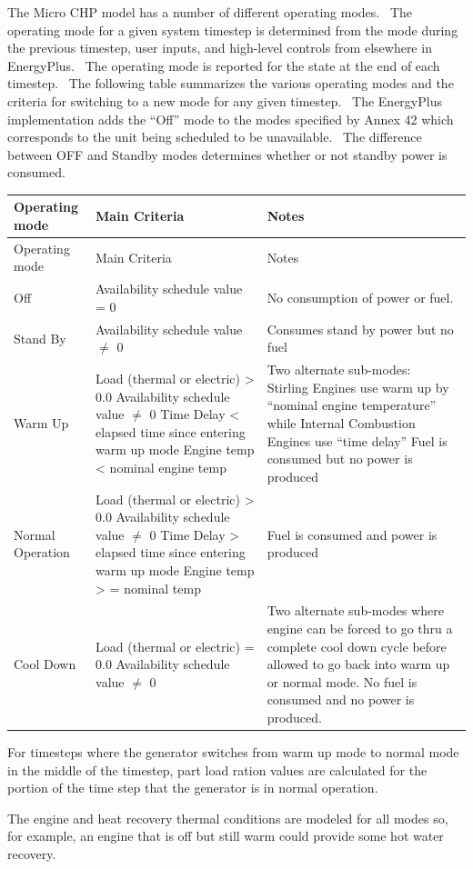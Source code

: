 The Micro CHP model has a number of different operating modes.~ The operating mode for a given system timestep is determined from the mode during the previous timestep, user inputs, and high-level controls from elsewhere in EnergyPlus.~ The operating mode is reported for the state at the end of each timestep.~ The following table summarizes the various operating modes and the criteria for switching to a new mode for any given timestep.~ The EnergyPlus implementation adds the ``Off'' mode to the modes specified by Annex 42 which corresponds to the unit being scheduled to be unavailable.~ The difference between OFF and Standby modes determines whether or not standby power is consumed.

\begin{longtable}[c]{p{1.5in}p{2.05in}p{2.44in}}
\toprule 
Operating mode & Main Criteria & Notes \tabularnewline
\midrule
\endfirsthead

\toprule 
Operating mode & Main Criteria & Notes \tabularnewline
\midrule
\endhead

Off & Availability schedule value = 0 & No consumption of power or fuel. \tabularnewline
Stand By & Availability schedule value \(\neq\) 0 & Consumes stand by power but no fuel \tabularnewline
Warm Up & Load (thermal or electric)  >  0.0 Availability schedule value \(\neq\) 0 Time Delay  <  elapsed time since entering warm up mode Engine temp  <  nominal engine temp & Two alternate sub-modes:~ Stirling Engines use warm up by “nominal engine temperature” while Internal Combustion Engines use “time delay” Fuel is consumed but no power is produced \tabularnewline
Normal Operation & Load (thermal or electric)  >  0.0 Availability schedule value \(\neq\) 0 Time Delay  >  elapsed time since entering warm up mode Engine temp  > = nominal temp & Fuel is consumed and power is produced \tabularnewline
Cool Down & Load (thermal or electric) = 0.0 Availability schedule value \(\neq\) 0 & Two alternate sub-modes where engine can be forced to go thru a complete cool down cycle before allowed to go back into warm up or normal mode. No fuel is consumed and no power is produced. \tabularnewline
\bottomrule
\end{longtable}

For timesteps where the generator switches from warm up mode to normal mode in the middle of the timestep, part load ration values are calculated for the portion of the time step that the generator is in normal operation.

The engine and heat recovery thermal conditions are modeled for all modes so, for example, an engine that is off but still warm could provide some hot water recovery.

